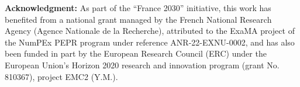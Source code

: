 \documentclass[a1paper]{tikzposter}
\begin{document}
\begin{columns}
{    
    {
        \nocite{*}
        \printbibliography[heading=none]

        \vspace{0.5cm}
        \small
        \textbf{Acknowledgment:} 	As part of the “France 2030” initiative, this work has benefited from a national grant managed by the French National Research Agency (Agence Nationale de la Recherche), attributed to the ExaMA project of the NumPEx PEPR program under reference ANR-22-EXNU-0002, and has also been funded in part by the European Research Council (ERC) under the European Union’s Horizon 2020 research and innovation program (grant No. 810367), project EMC2 (Y.M.).
    

    } 

     

  

}

\end{columns}
\end{document}
